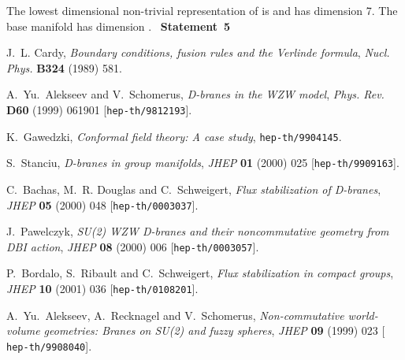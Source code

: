 \documentclass[12pt,a4paper]{article}
\begin{document}
\begin{appendix}
\begin{itemize}
The lowest dimensional non-trivial representation of \coordHE{} is
\coordHE{} and has dimension 7. The base manifold has dimension \coordHE{}. \myHighlight{$\Rightarrow $}\coordHE{}~{\bf Statement~5}
\end{itemize}
\end{appendix}

\newpage

\providecommand{\href}[2]{#2}\begingroup\raggedright\begin{thebibliography}{10}

J.~L. Cardy, {\it Boundary conditions, fusion rules and the {Verlinde}
  formula},  {\em Nucl. Phys.} {\bf B324} (1989) 581.

A.~Yu.~Alekseev and V.~Schomerus, {\it {D-branes} in the {WZW} model},  {\em
  Phys. Rev.} {\bf D60} (1999) 061901
  [\href{http://arXiv.org/abs/hep-th/9812193}{{\tt hep-th/9812193}}].

K.~Gawedzki, {\it Conformal field theory: {A} case study},
  \href{http://arXiv.org/abs/hep-th/9904145}{{\tt hep-th/9904145}}.

S.~Stanciu, {\it D-branes in group manifolds},  {\em JHEP} {\bf 01} (2000) 025
  [\href{http://arXiv.org/abs/hep-th/9909163}{{\tt hep-th/9909163}}].

C.~Bachas, M.~R. Douglas and C.~Schweigert, {\it Flux stabilization of
  {D-branes}},  {\em JHEP} {\bf 05} (2000) 048
  [\href{http://arXiv.org/abs/hep-th/0003037}{{\tt hep-th/0003037}}].

J.~Pawelczyk, {\it {SU(2)} {WZW} {D-branes} and their noncommutative geometry
  from {DBI} action},  {\em JHEP} {\bf 08} (2000) 006
  [\href{http://arXiv.org/abs/hep-th/0003057}{{\tt hep-th/0003057}}].

P.~Bordalo, S.~Ribault and C.~Schweigert, {\it Flux stabilization in compact
  groups},  {\em JHEP} {\bf 10} (2001) 036
  [\href{http://arXiv.org/abs/hep-th/0108201}{{\tt hep-th/0108201}}].

A.~Yu.~Alekseev, A.~Recknagel and V.~Schomerus, {\it Non-commutative
  world-volume geometries: {Branes} on {SU(2)} and fuzzy spheres},  {\em JHEP}
  {\bf 09} (1999) 023 [\href{http://arXiv.org/abs/hep-th/9908040}{{\tt
  hep-th/9908040}}].


\end{thebibliography}
\end{document}
